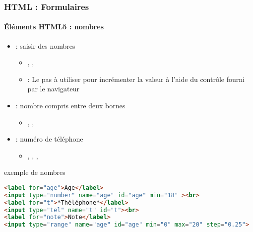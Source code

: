 \documentclass[xcolor=table]{beamer}
\begin{document}
\begin{frame}[fragile]
\frametitle{HTML : Formulaires}
\framesubtitle{Éléments HTML5 : nombres}

\begin{itemize}
	\item {} :  saisir des nombres
	\begin{itemize}
		\item {}, , 
		\item {} : Le pas à utiliser pour incrémenter la valeur à l'aide du contrôle fourni par le navigateur
	\end{itemize}
	\item {} : nombre compris entre deux bornes
	\begin{itemize}
		\item {}, , 
	\end{itemize}
	\item {} : numéro de téléphone
	\begin{itemize}
		\item {}, , , 
	\end{itemize}
\end{itemize}

\begin{exampleblock}{exemple de nombres}
\lstset{escapeinside=**}
\scriptsize\bfseries\vspace{-6pt}
\begin{lstlisting}[language={html}]
<label for="age">Age</label>
<input type="number" name="age" id="age" min="18" ><br>
<label for="t">*Théléphone*</label>
<input type="tel" name="t" id="t"><br>
<label for="note">Note</label>
<input type="range" name="age" id="age" min="0" max="20" step="0.25">
\end{lstlisting}\vspace{-6pt}
\end{exampleblock}

\end{frame}
\end{document}
